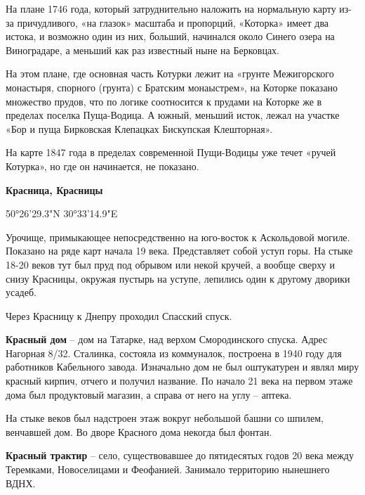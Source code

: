 На плане 1746 года, который затруднительно наложить на нормальную карту из-за причудливого, «на глазок» масштаба и пропорций, «Которка» имеет два истока, и возможно один из них, больший, начинался около Синего озера на Виноградаре, а меньший как раз известный ныне на Берковцах. 

На этом плане, где основная часть Котурки лежит на «грунте Межигорского монастыря, спорного (грунта) с Братским монаыстрем», на Которке показано множество прудов, что по логике соотносится к прудами на Которке же в пределах поселка Пуща-Водица. А южный, меньший исток, лежал на участке «Бор и пуща Бирковская Клепацках Бискупская Клешторная».

На карте 1847 года в пределах современной Пущи-Водицы уже течет «ручей Котурка», но где он начинается, не показано.\\


\medskip

\textbf{Красница, Красницы} 

50°26'29.3"N 30°33'14.9"E

Урочище, примыкающее непосредственно на юго-восток к Аскольдовой могиле. Показано на ряде карт начала 19 века. Представляет собой уступ горы. На стыке 18-20 веков тут был пруд под обрывом или некой кручей, а вообще сверху и снизу Красницы, окружая пустырь на уступе, лепились один к другому дворики усадеб.

Через Красницу к Днепру проходил Спасский спуск.\\

\medskip

\textbf{Красный дом} – дом на Татарке, над верхом Смородинского спуска. Адрес Нагорная 8/32. Сталинка, состояла из коммуналок, построена в 1940 году для работников Кабельного завода. Изначально дом не был оштукатурен и являл миру красный кирпич, отчего и получил название. По начало 21 века на первом этаже дома был продуктовый магазин, а справа от него на углу – аптека.

На стыке веков был надстроен этаж вокруг небольшой башни со шпилем, венчавшей дом. Во дворе Красного дома некогда был фонтан.\\    

\medskip

\textbf{Красный трактир} – село, существовавшее до пятидесятых годов 20 века между Теремками, Новоселицами и Феофанией. Занимало территорию нынешнего ВДНХ.\\



